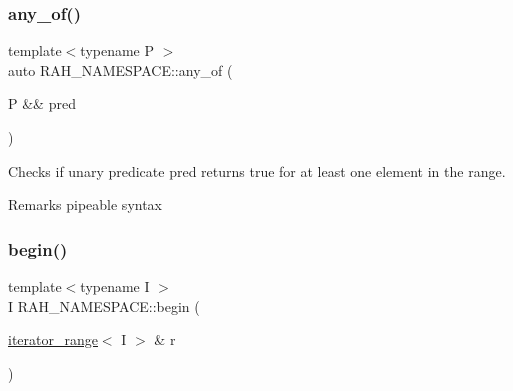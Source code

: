 \subsubsection{\texorpdfstring{any\_of()}{any\_of()}\hspace{0.1cm}{\footnotesize\ttfamily [2/2]}}
{\footnotesize\ttfamily template$<$typename P $>$ \\
auto R\+A\+H\+\_\+\+N\+A\+M\+E\+S\+P\+A\+C\+E\+::any\+\_\+of (\begin{DoxyParamCaption}\item[{P \&\&}]{pred }\end{DoxyParamCaption})}



Checks if unary predicate pred returns true for at least one element in the range. 

\begin{DoxyRemark}{Remarks}
pipeable syntax
\end{DoxyRemark}

\begin{DoxyCodeInclude}{0}
\DoxyCodeLine{    ));}
\end{DoxyCodeInclude}
\mbox{\label{namespace_r_a_h___n_a_m_e_s_p_a_c_e_a40db588db40ca52dae948613525ac1b4}} 
\subsubsection{\texorpdfstring{begin()}{begin()}\hspace{0.1cm}{\footnotesize\ttfamily [1/2]}}
{\footnotesize\ttfamily template$<$typename I $>$ \\
I R\+A\+H\+\_\+\+N\+A\+M\+E\+S\+P\+A\+C\+E\+::begin (\begin{DoxyParamCaption}\item[{\mbox{\hyperlink{struct_r_a_h___n_a_m_e_s_p_a_c_e_1_1iterator__range}{iterator\+\_\+range}}$<$ I $>$ \&}]{r }\end{DoxyParamCaption})}

\mbox{\label{namespace_r_a_h___n_a_m_e_s_p_a_c_e_a226e473d9053e6dbcdc5fa4d135b7abe}} 
